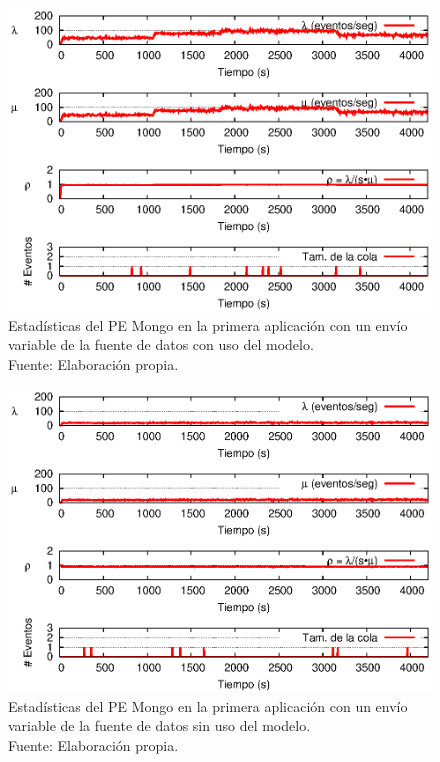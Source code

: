 \begin{figure}[!ht]
    \centering
    \captionsetup{justification=centering}
    \includegraphics[scale=1]{images/exp/app1/normal/cm/statusMongoPE.eps}
    \caption[Estadísticas del PE Mongo en la primera aplicación con un envío variable de la fuente de datos con uso del modelo.]{Estadísticas del PE Mongo en la primera aplicación con un envío variable de la fuente de datos con uso del modelo.\\Fuente: Elaboración propia.}
    \label{fig:app1-normal-statusMongoPE-cm}
\end{figure}

\begin{figure}[!ht]
    \centering
    \captionsetup{justification=centering}
    \includegraphics[scale=1]{images/exp/app1/normal/sm/statusMongoPE.eps}
    \caption[Estadísticas del PE Mongo en la primera aplicación con un envío variable de la fuente de datos sin uso del modelo.]{Estadísticas del PE Mongo en la primera aplicación con un envío variable de la fuente de datos sin uso del modelo.\\Fuente: Elaboración propia.}
    \label{fig:app1-normal-statusMongoPE-sm}
\end{figure}

